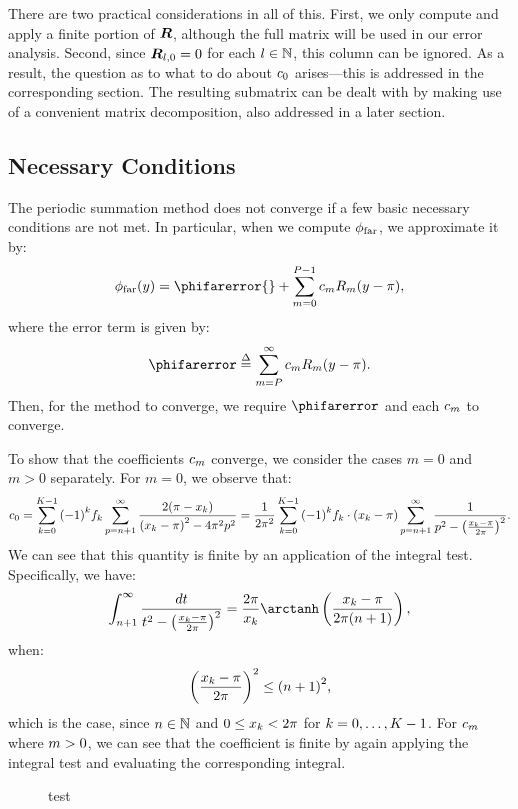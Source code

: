 There are two practical considerations in all of this. First, we only
compute and apply a finite portion of $\boldsymbol{R}$, although the full
matrix will be used in our error analysis. Second, since
$\boldsymbol{R}_{l,0} = 0$ for each $l\in\mathbb{N}$, this column can be ignored. As a
result, the question as to what to do about ${c}_{0}$
arises---this is addressed in the corresponding section. The resulting
submatrix can be dealt with by making use of a convenient matrix
decomposition, also addressed in a later section.

\subsection*{Necessary Conditions}

The periodic summation method does not converge if a few basic
necessary conditions are not met. In particular, when we compute
$\phi_{\operatorname{far}}$, we approximate it by:
\begin{align}
  \label{eq:phifar-approx}
  \phifar(\phiarg) = \phifarerror{} + \sum_{\powerindex=0}^{\truncnum-1} \ccoef{\powerindex} R_\powerindex(\phiarg - \pi),
\end{align}
where the error term is given by:
\begin{align}
  \label{eq:phifar-error}
  \phifarerror \defd \sum_{\powerindex=\truncnum}^{\infty} \ccoef{\powerindex} R_\powerindex(\phiarg - \pi).
\end{align}
Then, for the method to converge, we require $\phifarerror$ and each
$c_{m}$ to converge.

To show that the coefficients $c_{m}$ converge, we
consider the cases $m = 0$ and $m > 0$ separately. For $m = 0$, we
observe that:
\begin{align*}
  c_{0} = \sum_{{k}=0}^{K{}-1} {(-1)}^k {f}_{k{}} \sum_{p=n+1}^\infty \frac{2(\pi - {x}_{k})}{{({x}_{k} - \pi)}^2 - 4\pi^2p^2} = \frac{1}{2\pi^2} \sum_{{k}=0}^{K{}-1} {(-1)}^k {f}_{k{}} \cdot {({x}_{k} - \pi)} \sum_{p=n+1}^\infty \frac{1}{p^2 - \left(\frac{{x}_{k} - \pi}{2\pi}\right)^2}.
\end{align*}
We can see that this quantity is finite by an application of the
integral test. Specifically, we have:
\begin{align*}
  \int_{\neighborhoodradius+1}^\infty \frac{dt}{t^2 - \parens{\frac{\unifpt{\unifptindex} - \pi}{2\pi}}^2} = \frac{2\pi}{\unifpt{\unifptindex}} \arctanh \parens{\frac{\unifpt{\unifptindex} - \pi}{2\pi(\neighborhoodradius+1)}},
\end{align*}
when:
\begin{align*}
  \left(\frac{{x}_{k}-\pi}{2\pi}\right)^2 \leq {(n+1)}^2,
\end{align*}
which is the case, since $n \in \mathbb{N}$ and
$0 \leq {x}_{k} < 2\pi$ for
$k = 0, \hdots, K-1$. For $c_{m}$ where
$m > 0$, we can see that the coefficient is finite by again
applying the integral test and evaluating the corresponding integral.

\begin{figure}[h]
  \centering
  
  \caption{test}\label{fig:errorbound}
\end{figure}

